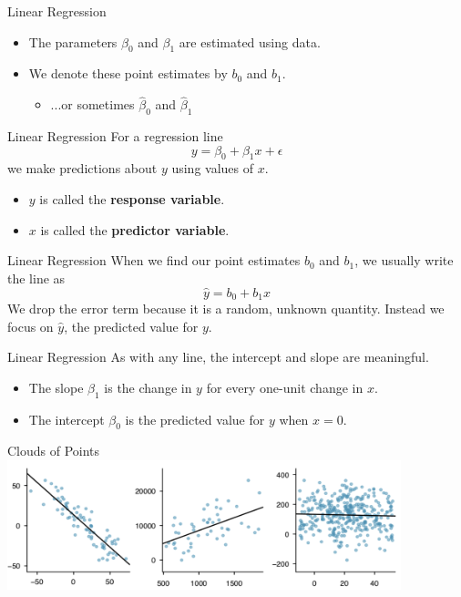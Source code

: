 \begin{frame}{Linear Regression}
    \begin{itemize}
        \item The parameters $\beta_0$ and $\beta_1$ are estimated using data.
        \item We denote these point estimates by $b_0$ and $b_1$.
        \begin{itemize}
            \item ...or sometimes $\hat{\beta}_0$ and $\hat{\beta}_1$
        \end{itemize}
    \end{itemize}
\end{frame}

\begin{frame}{Linear Regression}
    For a regression line
    \[
        y = \beta_0 + \beta_1 x + \epsilon
    \]
    we make predictions about $y$ using values of $x$.
    \begin{itemize}
        \item $y$ is called the \textbf{response variable}.
        \item $x$ is called the \textbf{predictor variable}. 
    \end{itemize}
\end{frame}

\begin{frame}{Linear Regression}
    When we find our point estimates $b_0$ and $b_1$, we usually write the line as
    \[
        \hat{y} = b_0 + b_1 x
    \]
    We drop the error term because it is a random, unknown quantity. Instead we focus on $\hat{y}$, the predicted value for $y$. 
\end{frame}

\begin{frame}{Linear Regression}
    As with any line, the intercept and slope are meaningful.
    \begin{itemize}
        \item The slope $\beta_1$ is the change in $y$ for every one-unit change in $x$.
        \item The intercept $\beta_0$ is the predicted value for $y$ when $x=0$.
    \end{itemize}
\end{frame}

\begin{frame}{Clouds of Points}
        \centering
        \includegraphics[width=4.5in]{images/ptclouds.png}
\end{frame}

